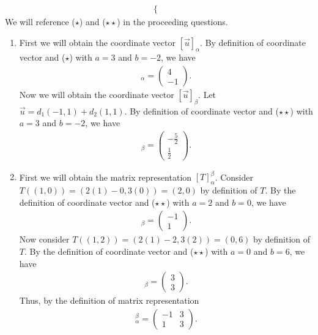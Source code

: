 \documentclass[12pt,answers]{exam}
\begin{document}
\begin{solution}
\begin{align}
\begin{cases}
\end{cases}
\end{align}
We will reference ($\star$) and ($\star\star$) in the proceeding questions.
\begin{enumerate}[label=(\alph*)]
\item 
{}
First we will obtain the coordinate vector $[\vec{u}]_{\alpha}$. By definition of coordinate vector and ($\star$) with $a=3$ and $b=-2$, we have
\begin{align*}
    [\vec{u}]_{\alpha}=\begin{pmatrix} 4 \\ -1 \end{pmatrix}.
\end{align*}
Now we will obtain the coordinate vector $[\vec{u}]_{\beta}$. Let $\vec{u}=d_{1}(-1,1)+d_{2}(1,1)$. By definition of coordinate vector and ($\star\star$) with $a=3$ and $b=-2$, we have
\begin{align*}
    [\vec{u}]_{\beta}=\begin{pmatrix} -\frac{5}{2} \\ \frac{1}{2} \end{pmatrix}.
\end{align*}
\item First we will obtain the matrix representation $[T]^{\beta}_{\alpha}$. Consider $T((1,0))=(2(1)-0,3(0))=(2,0)$ by definition of $T$. By the definition of coordinate vector and ($\star\star$) with $a=2$ and $b=0$, we have
\begin{align*}
    [T(1,0)]_{\beta}=\begin{pmatrix} -1 \\ 1 \end{pmatrix}.
\end{align*}
Now consider $T((1,2))=(2(1)-2,3(2))=(0,6)$ by definition of $T$. By the definition of coordinate vector and ($\star\star$) with $a=0$ and $b=6$, we have
\begin{align*}
    [T(1,2)]_{\beta}=\begin{pmatrix} 3 \\ 3 \end{pmatrix}.
\end{align*}
Thus, by the definition of matrix representation
\begin{align*}
    [T]^{\beta}_{\alpha}=\begin{pmatrix} -1 & 3 \\ 1 & 3\end{pmatrix}.
\end{align*}

\end{enumerate}
\end{solution}
\end{document}
